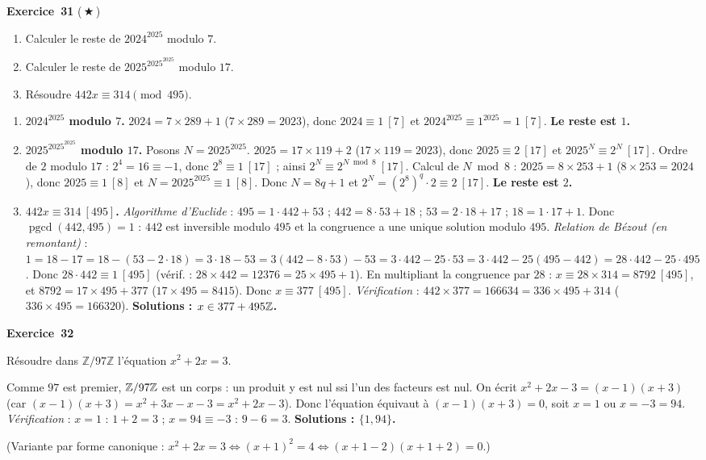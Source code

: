 \documentclass[11pt,a4paper]{article}
\newcommand{\pgcd}{\operatorname{pgcd}}
\begin{document}
	\medskip\noindent\textbf{\Large\color{bleu}Exercice~31} \textnormal{(\,$\bigstar$\,)}\nopagebreak
	\begin{enonce}
		\begin{enumerate}
			\item Calculer le reste de $2024^{2025}$ modulo $7$.
			\item Calculer le reste de $2025^{2025^{2025}}$ modulo $17$.
			\item Résoudre $442x\equiv 314\pmod{495}$.
		\end{enumerate}
	\end{enonce}
	\begin{corrige}
		\begin{enumerate}
			\item \textbf{$2024^{2025}$ modulo $7$.} $2024=7\times289+1$ ($7\times289=2023$), donc $2024\equiv1\ [7]$ et $2024^{2025}\equiv1^{2025}=1\ [7]$. \textbf{Le reste est $1$.}
			\item \textbf{$2025^{2025^{2025}}$ modulo $17$.} Posons $N=2025^{2025}$. $2025=17\times119+2$ ($17\times119=2023$), donc $2025\equiv2\ [17]$ et $2025^N\equiv2^N\ [17]$. Ordre de $2$ modulo $17$ : $2^4=16\equiv-1$, donc $2^8\equiv1\ [17]$ ; ainsi $2^N\equiv2^{N\bmod8}\ [17]$. Calcul de $N\bmod8$ : $2025=8\times253+1$ ($8\times253=2024$), donc $2025\equiv1\ [8]$ et $N=2025^{2025}\equiv1\ [8]$. Donc $N=8q+1$ et $2^N=(2^8)^q\cdot2\equiv2\ [17]$. \textbf{Le reste est $2$.}
			\item \textbf{$442x\equiv314\ [495]$.} \emph{Algorithme d'Euclide} : $495=1\cdot442+53$ ; $442=8\cdot53+18$ ; $53=2\cdot18+17$ ; $18=1\cdot17+1$. Donc $\pgcd(442,495)=1$ : $442$ est inversible modulo $495$ et la congruence a une unique solution modulo $495$. \emph{Relation de Bézout (en remontant)} : $1=18-17=18-(53-2\cdot18)=3\cdot18-53=3(442-8\cdot53)-53=3\cdot442-25\cdot53=3\cdot442-25(495-442)=28\cdot442-25\cdot495$. Donc $28\cdot442\equiv1\ [495]$ (vérif. : $28\times442=12376=25\times495+1$). En multipliant la congruence par $28$ : $x\equiv28\times314=8792\ [495]$, et $8792=17\times495+377$ ($17\times495=8415$). Donc $x\equiv377\ [495]$. \emph{Vérification} : $442\times377=166634=336\times495+314$ ($336\times495=166320$). \textbf{Solutions : $x\in377+495\mathbb{Z}$.}
		\end{enumerate}
	\end{corrige}
	
	\medskip\noindent\textbf{\Large\color{bleu}Exercice~32}\nopagebreak
	\begin{enonce}
		Résoudre dans $\mathbb{Z}/97\mathbb{Z}$ l’équation $x^2+2x=3$.
	\end{enonce}
	\begin{corrige}
		Comme $97$ est premier, $\mathbb{Z}/97\mathbb{Z}$ est un corps : un produit y est nul ssi l'un des facteurs est nul. On écrit $x^2+2x-3=(x-1)(x+3)$ (car $(x-1)(x+3)=x^2+3x-x-3=x^2+2x-3$). Donc l'équation équivaut à $(x-1)(x+3)=0$, soit $x=1$ ou $x=-3=94$. \emph{Vérification} : $x=1$ : $1+2=3$ ; $x=94\equiv-3$ : $9-6=3$. \textbf{Solutions : $\{1,94\}$.}
		
		(Variante par forme canonique : $x^2+2x=3\iff(x+1)^2=4\iff(x+1-2)(x+1+2)=0$.)
	\end{corrige}
	
\end{document}
